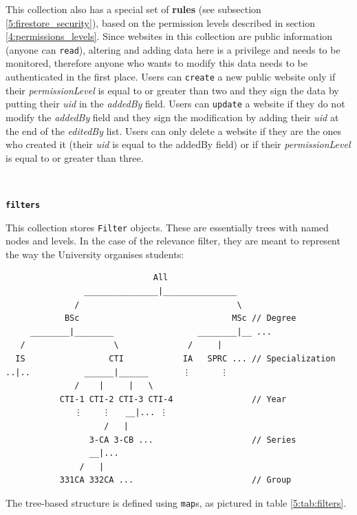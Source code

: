 This collection also has a special set of \textbf{rules}\textit{} (see subsection \ref{5:firestore_security}), based on the permission levels described in section \ref{4:permissions_levels}. Since websites in this collection are public information (anyone can \texttt{read}), altering and adding data here is a privilege and needs to be monitored, therefore anyone who wants to modify this data needs to be authenticated in the first place. Users can \texttt{create} a new public website only if their \textit{permissionLevel} is equal to or greater than two  and they sign the data by putting their \textit{uid} in the \textit{addedBy} field. Users can \texttt{update} a website if they do not modify the \textit{addedBy} field and they sign the modification by adding their \textit{uid} at the end of the \textit{editedBy} list. Users can only delete a website if they are the ones who created it (their \textit{uid} is equal to the addedBy field) or if their \textit{permissionLevel} is equal to or greater than three.

~

\faDatabase \hspace{0.1cm} \textbf{\texttt{filters}}

This collection stores \texttt{Filter} objects. These are essentially trees with named nodes and levels. In the case of the relevance filter, they are meant to represent the way the University organises students:

\begin{verbatim}
                              All
                _______________|_______________
              /                                \
            BSc                               MSc // Degree
     ________|________                 ________|__ ...
   /                  \              /     |
  IS                 CTI            IA   SPRC ... // Specialization
..|..           ______|______       ⋮      ⋮
              /    |     |   \
           CTI-1 CTI-2 CTI-3 CTI-4                // Year
              ⋮    ⋮   __|... ⋮
                    /   |
                 3-CA 3-CB ...                    // Series
                 __|...
               /   |
           331CA 332CA ...                        // Group
\end{verbatim}

The tree-based structure is defined using \texttt{map}s, as pictured in table \ref{5:tab:filters}.

